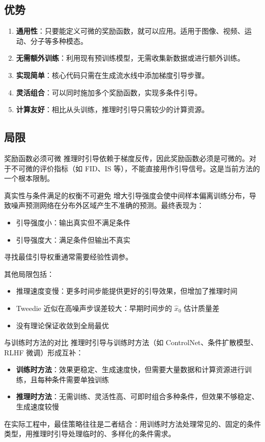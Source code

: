 \documentclass[a4paper]{article}
\begin{document}
\subsection{优势}

\begin{enumerate}
    \item \textbf{通用性}：只要能定义可微的奖励函数，就可以应用。适用于图像、视频、运动、分子等多种模态。
    \item \textbf{无需额外训练}：利用现有预训练模型，无需收集新数据或进行额外训练。
    \item \textbf{实现简单}：核心代码只需在生成流水线中添加梯度引导步骤。
    \item \textbf{灵活组合}：可以同时施加多个奖励函数，实现多条件引导。
    \item \textbf{计算友好}：相比从头训练，推理时引导只需较少的计算资源。
\end{enumerate}

\subsection{局限}

\begin{warningbox}{奖励函数必须可微}
推理时引导依赖于梯度反传，因此奖励函数必须是可微的。对于不可微的评价指标（如 FID、IS 等），不能直接用作引导信号。这是当前方法的一个根本限制。
\end{warningbox}

\begin{warningbox}{真实性与条件满足的权衡不可避免}
增大引导强度会使中间样本偏离训练分布，导致噪声预测网络在分布外区域产生不准确的预测。最终表现为：
\begin{itemize}
    \item 引导强度小：输出真实但不满足条件
    \item 引导强度大：满足条件但输出不真实
\end{itemize}
寻找最佳引导权重通常需要经验性调参。
\end{warningbox}

其他局限包括：
\begin{itemize}
    \item 推理速度变慢：更多时间步能提供更好的引导效果，但增加了推理时间
    \item Tweedie 近似在高噪声步误差较大：早期时间步的 $\hat{x}_0$ 估计质量差
    \item 没有理论保证收敛到全局最优
\end{itemize}

\begin{knowledgebox}{与训练时方法的对比}
推理时引导与训练时方法（如 ControlNet、条件扩散模型、RLHF 微调）形成互补：
\begin{itemize}
    \item \textbf{训练时方法}：效果更稳定、生成速度快，但需要大量数据和计算资源进行训练，且每种条件需要单独训练
    \item \textbf{推理时方法}：无需训练、灵活性高、可即时组合多种条件，但效果不够稳定、生成速度较慢
\end{itemize}
在实际工程中，最佳策略往往是二者结合：用训练时方法处理常见的、固定的条件类型，用推理时引导处理临时的、多样化的条件需求。
\end{knowledgebox}
\end{document}
